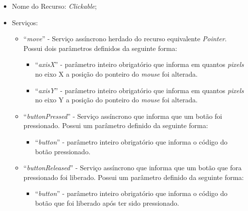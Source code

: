 \begin{itemize}
	
	\item Nome do Recurso: \emph{Clickable};

	\item Serviços:
		
		\begin{itemize}

			\item ``\emph{move}'' - Serviço assíncrono herdado do recurso equivalente \emph{Pointer}. Possui dois parâmetros definidos da seguinte forma:

				\begin{itemize}
					\item ``\emph{axisX}'' - parâmetro inteiro obrigatório que informa em quantos \emph{pixels} no eixo X a posição do ponteiro do \emph{mouse} foi alterada.

					\item ``\emph{axisY}'' - parâmetro inteiro obrigatório que informa em quantos \emph{pixels} no eixo Y a posição do ponteiro do \emph{mouse} foi alterada.
				\end{itemize}
			
			\item ``\emph{buttonPressed}'' - Serviço assíncrono que informa que um botão foi pressionado. Possui um parâmetro definido da seguinte forma:

				\begin{itemize}
					\item ``\emph{button}'' - parâmetro inteiro obrigatório que informa o código do botão pressionado.
				\end{itemize}
			
			\item ``\emph{buttonReleased}'' - Serviço assíncrono que informa que um botão que fora pressionado foi liberado. Possui um parâmetro definido da seguinte forma:

				\begin{itemize}
					\item ``\emph{button}'' - parâmetro inteiro obrigatório que informa o código do botão que foi liberado após ter sido pressionado.
				\end{itemize}

		\end{itemize}
\end{itemize}

